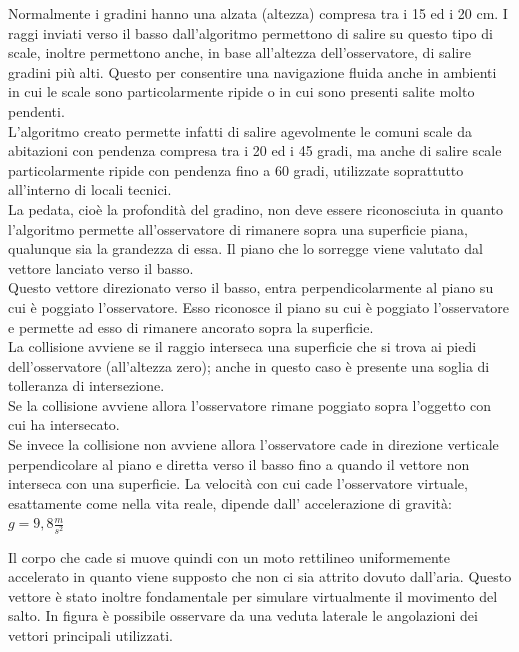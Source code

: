 Normalmente i gradini hanno una alzata (altezza) compresa tra i 15 ed i 20 cm.
I raggi inviati verso il basso dall’algoritmo permettono di salire su questo tipo di scale, inoltre permettono anche, in base all’altezza dell’osservatore, di salire gradini più alti. 
Questo per consentire una navigazione fluida anche in ambienti in cui le scale sono particolarmente ripide o in cui sono presenti salite molto pendenti.
\\ 
L’algoritmo creato permette infatti di salire agevolmente le comuni scale da abitazioni con pendenza compresa tra i 20 ed i 45 gradi, ma anche di salire scale particolarmente ripide con pendenza fino a 60 gradi, utilizzate soprattutto all’interno di locali tecnici.
\\
La pedata, cioè la profondità del gradino, non deve essere riconosciuta in quanto l’algoritmo permette all’osservatore di rimanere sopra una superficie piana, qualunque sia la grandezza di essa. Il piano che lo sorregge viene valutato dal vettore lanciato verso il basso.
\\
Questo vettore direzionato verso il basso, entra perpendicolarmente al piano su cui è poggiato l’osservatore. Esso riconosce il piano su cui è poggiato l’osservatore  e permette ad esso di rimanere ancorato sopra la superficie.
\\
La collisione avviene se il raggio interseca una superficie che si trova ai piedi dell’osservatore (all’altezza zero); anche in questo caso è presente una soglia di tolleranza di intersezione.
\\ 
Se la collisione avviene allora l’osservatore rimane poggiato sopra l’oggetto con cui ha intersecato.
\\
Se invece la collisione non avviene allora l’osservatore cade in direzione verticale perpendicolare al piano e diretta verso il basso fino a quando il vettore non interseca con una superficie. La velocità con cui cade l’osservatore virtuale, esattamente come nella vita reale, dipende dall’ accelerazione di gravità: $g = 9,8 \frac{m}{s^2}$

Il corpo che cade si muove quindi con un moto rettilineo uniformemente accelerato in quanto viene supposto che non ci sia attrito dovuto dall’aria.
Questo vettore è stato inoltre fondamentale per simulare virtualmente il movimento del salto.
In figura è possibile osservare da una veduta laterale le angolazioni dei vettori principali utilizzati.

